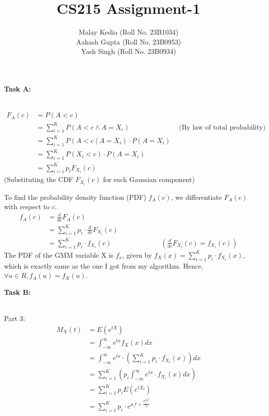 \documentclass[a4paper,12pt,answers]{exam}
\title{CS215 Assignment-1}
\author{Malay Kedia (Roll No. 23B1034) \\ Aakash Gupta (Roll No. 23B0953) \\ Yash Singh (Roll No. 23B0934)}
\date{}
\begin{document}
\maketitle

\begin{questions}

\textbf{Task A:}
\begin{solution}\\
\begin{align*}
F_{A}(c)&=P(A<c)\\
&=\sum_{i=1}^{K} P(A < c \land A = X_i) \hspace{3cm} \text{(By law of total probability)}\\
&=\sum_{i=1}^{K} P(A < c \mid A = X_i) \cdot P(A = X_i)\\
&=\sum_{i=1}^{K} P(X_i < c) \cdot P(A = X_i)\\
&= \sum_{i=1}^{K} p_i F_{X_i}(c)
\end{align*}
(Substituting the CDF $F_{X_i}(c)$ for each Gaussian component)

To find the probability density function (PDF) $f_A(c)$, we differentiate $F_A(c)$ with respect to $c$.
\begin{align*}
f_A(c) &= \frac{d}{dc} F_A(c)\\
&= \sum_{i=1}^{K} p_i \cdot \frac{d}{dc} F_{X_i}(c)\\
&= \sum_{i=1}^{K} p_i \cdot f_{X_i}(c) \hspace{3cm} (\frac{d}{dc} F_{X_i}(c) = f_{X_i}(c))
\end{align*}
The PDF of the GMM variable X is $f_x$, given by $f_X(x)=\sum_{i=1}^{K} p_i \cdot f_{X_i}(x)$, which is exactly same as the one I got from my algorithm. Hence, $\forall u \in R, f_A(u)=f_X(u)$.
\end{solution}

\textbf{Task B:}
\begin{solution}\\
Part 3:\\
\begin{align*}
M_X(t)&=E(e^{tX})\\
&=\int_{-\infty}^{\infty} e^{tx} f_X(x) dx\\
&=\int_{-\infty}^{\infty} e^{tx}  \cdot (\sum_{i=1}^{K} p_i \cdot f_{X_i}(x)) dx\\
&=\sum_{i=1}^{K} (p_i \int_{-\infty}^{\infty} e^{tx} \cdot f_{X_i}(x) dx )\\
&=\sum_{i=1}^{K} p_i E(e^{t X_i})\\
&=\sum_{i=1}^{K} p_i \cdot e^{\mu_i t + \frac{\sigma_i^2 t^2}{2}}
\end{align*}


\end{solution}
\end{questions}
\end{document}
